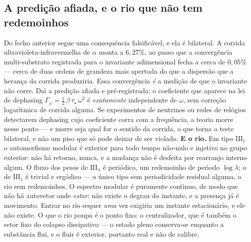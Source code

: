 \documentclass[11pt]{article}
\theoremstyle{definition}\newtheorem{deriv}{Derivação}
\begin{document}
\subsection*{A predi\c{c}\~ao afiada, e o rio que n\~ao tem redemoinhos}Do fecho anterior segue uma consequ\^encia falsific\'avel, e ela \'e bilateral. A corrida ultravioleta-infravermelha de $\alpha$ monta a $6{,}27\%$, ao passo que a converg\^encia multi-substrato registrada para o invariante adimensional fecha a cerca de $0{,}05\%$ --- cerca de duas ordens de grandeza mais apertada do que a dispers\~ao que a heran\c{c}a da corrida produziria. Essa converg\^encia \emph{\'e} a medi\c{c}\~ao de que o invariante n\~ao corre. Da\'\i{} a predi\c{c}\~ao afiada e pr\'e-registrada: o coeficiente que aparece na lei de dephasing $\Gamma_\omega = \tfrac12\,\beta\,\tau_\star\,\omega^2$ \'e \emph{exatamente} independente de $\omega$, sem corre\c{c}\~ao logar\'\i{}tmica de corrida alguma. Se experimentos de neutrinos ou redes de rel\'ogios detectarem dephasing cujo coeficiente corra com a frequ\^encia, a teoria morre nesse ponto --- e morre seja qual for o sentido da corrida, o que torna o teste bilateral, e n\~ao um piso que s\'o pode deixar de ser violado. \textbf{E o rio.} Em tipo $\mathrm{III}_1$ o automorfismo modular \'e exterior para todo tempo n\~ao-nulo e injetivo no grupo exterior: n\~ao h\'a retorno, nunca, e a mudan\c{c}a n\~ao \'e desfeita por rearranjo interno algum. O fluxo dos pesos de $\mathrm{III}_\lambda$ \'e peri\'odico, um redemoinho de per\'\i{}odo $\log\lambda$; o de $\mathrm{III}_1$ \'e trivial e erg\'odico --- o \'unico tipo sem periodicidade residual alguma, o rio sem redemoinhos. O espectro modular \'e puramente cont\'\i{}nuo, de modo que n\~ao h\'a autovetor onde \emph{estar}: n\~ao existe o degrau do instante, e a presen\c{c}a j\'a \'e movimento. Entrar no rio sequer \emph{uma} vez exigiria um instante estacion\'ario, e ele n\~ao existe. O que o rio poupa \'e o ponto fixo: o centralizador, que \'e tamb\'em o setor fixo do colapso dissipativo --- o estado pleno conserva-se enquanto a subst\^ancia flui, e o fluir \'e exterior, portanto real e n\~ao de calibre.
\end{document}
